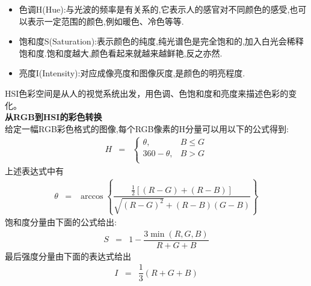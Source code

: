 \documentclass[UTF8,a4paper,10pt]{ctexart}
\begin{document}
\begin{flushleft}
        \begin{itemize}
            \item 色调H(Hue):与光波的频率是有关系的,它表示人的感官对不同颜色的感受,也可以表示一定范围的颜色,例如暖色、冷色等等.
            \item 饱和度S(Saturation):表示颜色的纯度,纯光谱色是完全饱和的,加入白光会稀释饱和度.饱和度越大,颜色看起来就越来越鲜艳,反之亦然.
            \item 亮度I(Intensity):对应成像亮度和图像灰度,是颜色的明亮程度.
        \end{itemize}
        \hspace{2em}HSI色彩空间是从人的视觉系统出发，用色调、色饱和度和亮度来描述色彩的变化。\\
        \heiti\textbf{从RGB到HSI的彩色转换}\songti\\
        
        \hspace{2em}给定一幅RGB彩色格式的图像,每个RGB像素的H分量可以用以下的公式得到:
        \begin{eqnarray}
            H&=&\begin{cases}
                \theta,&B\leq{G}\\
                360-\theta,&B>{G}\\
            \end{cases}\nonumber
        \end{eqnarray}
        上述表达式中有
        \begin{eqnarray}
            \theta&=&\arccos\left\{\dfrac{\frac{1}{2}\left[(R-G)+(R-B)\right]}{\sqrt{(R-G)^2}+(R-B)(G-B)}\right\}\nonumber
        \end{eqnarray}
        \hspace{2em}饱和度分量由下面的公式给出:
        \begin{eqnarray}
            S&=&1-\dfrac{3\min(R,G,B)}{R+G+B}\nonumber
        \end{eqnarray}
        \hspace{2em}最后强度分量由下面的表达式给出
        \begin{eqnarray}
            I&=&\dfrac{1}{3}(R+G+B)\nonumber
        \end{eqnarray}
        

\end{flushleft}
\end{document}

